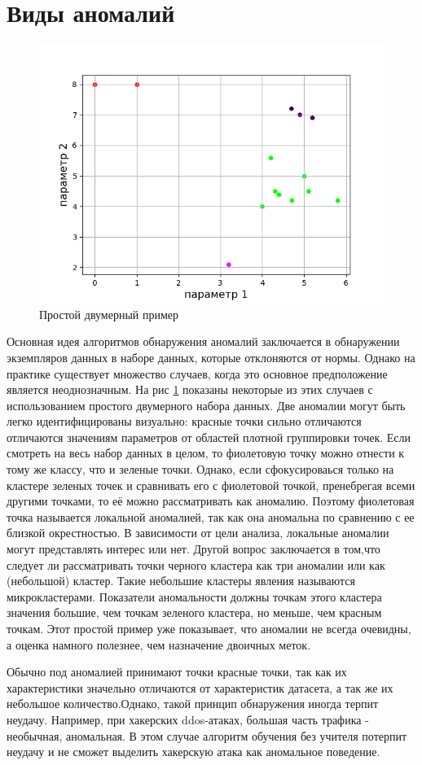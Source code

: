 \section{Виды аномалий}
\begin{figure}
	\centering
	\includegraphics[width=.5\textwidth]{img/1.png}
	\caption{Простой двумерный пример}
	\label{fig01}
\end{figure}

Основная идея алгоритмов обнаружения аномалий заключается в обнаружении экземпляров данных в наборе данных, которые отклоняются от нормы. Однако на практике существует множество случаев, когда это основное предположение является неоднозначным. На рис \ref{fig01} показаны некоторые из этих случаев с использованием простого двумерного набора данных. Две аномалии могут быть легко идентифицированы визуально: красные точки  сильно отличаются отличаются значениям параметров от областей плотной группировки точек. Если смотреть на весь набор данных в целом, то фиолетовую точку можно отнести к тому же классу, что и зеленые точки.  Однако, если сфокусироваься только на кластере зеленых точек и сравнивать его с фиолетовой точкой, пренебрегая всеми другими точками, то её можно рассматривать как аномалию. Поэтому фиолетовая точка называется локальной аномалией, так как она аномальна по сравнению с ее близкой окрестностью. В зависимости от цели анализа, локальные  аномалии могут представлять интерес или нет. 
Другой  вопрос  заключается в том,что следует ли рассматривать точки черного кластера  как три аномалии или как (небольшой) кластер. Такие небольшие кластеры явления называются микрокластерами. Показатели аномальности должны точкам этого кластера значения большие, чем точкам зеленого кластера, но меньше, чем красным точкам. Этот простой пример уже показывает, что аномалии не всегда очевидны, а оценка намного полезнее, чем назначение двоичных меток.

Обычно под аномалией принимают точки красные точки, так как их характеристики значельно отличаются от характеристик датасета, а так же их небольшое количество.Однако, такой принцип обнаружения иногда терпит неудачу. Например, при хакерских ddos-атаках, большая часть трафика - необычная, аномальная. В этом случае алгоритм обучения без учителя потерпит неудачу и не сможет выделить хакерскую атака как аномальное поведение.

